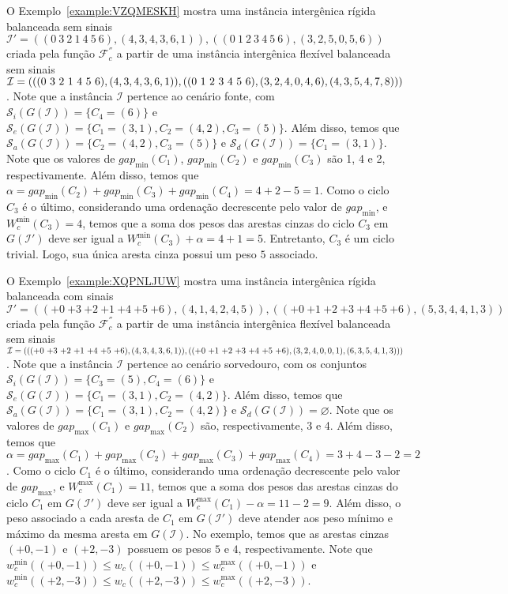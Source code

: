\pagebreak

O Exemplo~\ref{example:VZQMESKH} mostra uma instância intergênica rígida balanceada sem sinais $\mathcal{I}' = ((0~3~2~1~4~5~6),(4,3,4,3,6,1)),((0~1~2~3~4~5~6),(3,2,5,0,5,6))$ criada pela função $\mathcal{F}_{c}^{''}$ a partir de uma instância intergênica flexível balanceada sem sinais $\mathcal{I} = (((0~3~2~1~4~5~6),(4,3,4,\break3,6,1)),((0~1~2~3~4~5~6),(3,2,4,0,4,6),(4,3,5,4,7,8)))$. Note que a instância $\mathcal{I}$ pertence ao cenário fonte, com $\mathcal{S}_i(G(\mathcal{I})) = \{C_4=(6)\}$ e $\mathcal{S}_e(G(\mathcal{I})) = \{C_1=(3,1),C_2=(4,2),C_3=(5)\}$. Além disso, temos que $\mathcal{S}_a(G(\mathcal{I})) = \{C_2=(4,2),C_3=(5)\}$ e $\mathcal{S}_d(G(\mathcal{I})) = \{C_1=(3,1)\}$. Note que os valores de $gap_{\min}(C_1)$, $gap_{\min}(C_2)$ e $gap_{\min}(C_3)$ são 1, 4 e 2, respectivamente. Além disso, temos que $\alpha = gap_{\min}(C_2) + gap_{\min}(C_3) + gap_{\min}(C_4) = 4 + 2 - 5 = 1$. Como o ciclo $C_3$ é o último, considerando uma ordenação decrescente pelo valor de $gap_{\min}$, e $W^{\min}_c(C_3) = 4$, temos que a soma dos pesos das arestas cinzas do ciclo $C_3$ em $G(\mathcal{I}')$ deve ser igual a $W^{\min}_c(C_3) + \alpha = 4 + 1 = 5$. Entretanto, $C_3$ é um ciclo trivial. Logo, sua única aresta cinza possui um peso $5$ associado.




\pagebreak

O Exemplo~\ref{example:XQPNLJUW} mostra uma instância intergênica rígida balanceada com sinais $\mathcal{I}' = (({+0}~{+3}~{+2}~{+1}~{+4}~{+5}~{+6}),(4,1,4,2,4,5)),(({+0}~{+1}~{+2}~{+3}~{+4}~{+5}~{+6}),(5,3,4,4,1,3))$ criada pela função $\mathcal{F}_{c}^{''}$ a partir de uma instância intergênica flexível balanceada sem sinais $\mathcal{I} = ((({+0}~{+3}~{+2}~{+1}~{+4}~{+5}~{+6}),(4,3,4,3,6,1)),(({+0}~{+1}~{+2}~{+3}~{+4}~{+5}~{+6}),(3,2,4,0,0,\break1),(6,3,5,4,1,3)))$. Note que a instância $\mathcal{I}$ pertence ao cenário sorvedouro, com os conjuntos $\mathcal{S}_i(G(\mathcal{I})) = \{C_3=(5),C_4=(6)\}$ e $\mathcal{S}_e(G(\mathcal{I})) = \{C_1=(3,1),C_2=(4,2)\}$. Além disso, temos que $\mathcal{S}_a(G(\mathcal{I})) = \{C_1=(3,1),C_2=(4,2)\}$ e $\mathcal{S}_d(G(\mathcal{I})) = \varnothing$. Note que os valores de $gap_{\max}(C_1)$ e $gap_{\max}(C_2)$ são, respectivamente, 3 e 4. Além disso, temos que $\alpha = gap_{\max}(C_1) + gap_{\max}(C_2) + gap_{\max}(C_3) + gap_{\max}(C_4) = 3 + 4 - 3 - 2 = 2$. Como o ciclo $C_1$ é o último, considerando uma ordenação decrescente pelo valor de $gap_{\max}$, e $W^{\max}_c(C_1) = 11$, temos que a soma dos pesos das arestas cinzas do ciclo $C_1$ em $G(\mathcal{I}')$ deve ser igual a $W^{\max}_c(C_1) - \alpha = 11 - 2 = 9$. Além disso, o peso associado a cada aresta de $C_1$ em $G(\mathcal{I}')$ deve atender aos peso mínimo e máximo da mesma aresta em $G(\mathcal{I})$. No exemplo, temos que as arestas cinzas $({+0},{-1})$ e $({+2},{-3})$ possuem os pesos $5$ e $4$, respectivamente. Note que $w^{\min}_c(({+0},{-1})) \le w_c(({+0},{-1})) \le w^{\max}_c(({+0},{-1}))$ e $w^{\min}_c(({+2},{-3})) \le w_c(({+2},{-3})) \le w^{\max}_c(({+2},{-3}))$.

